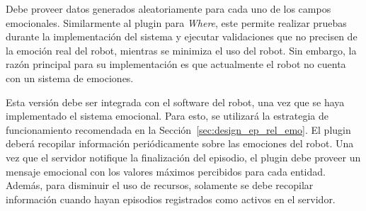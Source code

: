 Debe proveer datos generados aleatoriamente para cada uno de los campos emocionales. Similarmente al plugin para \textit{Where}, este permite realizar pruebas durante la implementación del sistema y ejecutar validaciones que no precisen de la emoción real del robot, mientras se minimiza el uso del robot. Sin embargo, la razón principal para su implementación es que actualmente el robot no cuenta con un sistema de emociones.

Esta versión debe ser integrada con el software del robot, una vez que se haya implementado el sistema emocional. Para esto, se utilizará la estrategia de funcionamiento recomendada en la Sección~\ref{sec:design_ep_rel_emo}. El plugin deberá recopilar información periódicamente sobre las emociones del robot. Una vez que el servidor notifique la finalización del episodio, el plugin debe proveer un mensaje emocional con los valores máximos percibidos para cada entidad. Además, para disminuir el uso de recursos, solamente se debe recopilar información cuando hayan episodios registrados como activos en el servidor.

%
%
%


